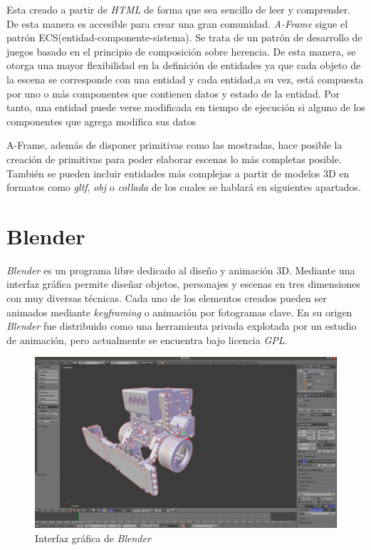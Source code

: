 Esta creado a partir de \textit{HTML} de forma que sea sencillo de leer y comprender. De esta manera es accesible para crear una gran comunidad. \textit{A-Frame} sigue el patrón ECS(entidad-componente-sistema). Se trata de un patrón de desarrollo de juegos basado en el principio de composición sobre herencia. De esta manera, se otorga una mayor flexibilidad en la definición de entidades ya que cada objeto de la escena se corresponde con una entidad y cada entidad,a su vez, está compuesta por uno o más componentes que contienen datos y estado de la entidad. Por tanto, una entidad puede verse modificada en tiempo de ejecución si alguno de los componentes que agrega modifica sus datos

A-Frame, además de disponer primitivas como las mostradas, hace posible la creación de primitivas para poder elaborar escenas lo más completas posible. También se pueden incluir entidades más complejas a partir de modelos 3D en formatos como \textit{gltf}, \textit{obj} o \textit{collada} de los cuales se hablará en siguientes apartados.






\section{Blender}
\label{sec:blender}
\textit{Blender} es un programa libre dedicado al diseño y animación 3D. Mediante una interfaz gráfica permite diseñar objetos, personajes y escenas en tres dimensiones con muy diversas técnicas. Cada uno de los elementos creados pueden ser animados mediante \textit{keyframing} o animación por fotogramas clave. En su origen \textit{Blender} fue distribuido como una herramienta privada explotada por un estudio de animación, pero actualmente se encuentra bajo licencia \textit{GPL}\cite{bib:gpl}. 

    
\begin{figure}[ht]
    \centering
    \includegraphics[width=1\textwidth]{img/primermodelo.png}
    \caption{Interfaz gráfica de \textit{Blender}} 
    \label{fig:blender}
\end{figure}

